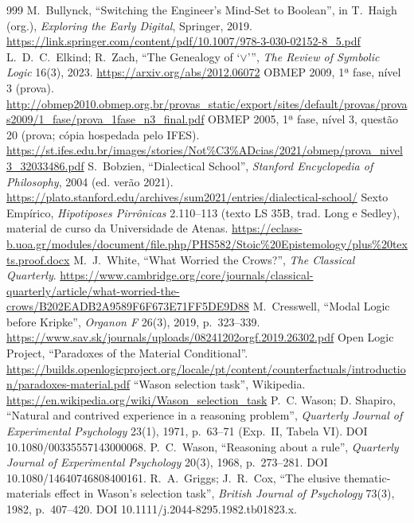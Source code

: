\begin{thebibliography}{999}
 M.~Bullynck, \enquote{Switching the Engineer's Mind-Set to Boolean}, in T.~Haigh (org.), \emph{Exploring the Early Digital}, Springer, 2019. \url{https://link.springer.com/content/pdf/10.1007/978-3-030-02152-8_5.pdf}
 L.~D.~C.~Elkind; R.~Zach, \enquote{The Genealogy of `$\vee$'}, \emph{The Review of Symbolic Logic} 16(3), 2023. \url{https://arxiv.org/abs/2012.06072}
 OBMEP 2009, 1ª fase, nível 3 (prova). \url{http://obmep2010.obmep.org.br/provas_static/export/sites/default/provas/provas2009/1_fase/prova_1fase_n3_final.pdf}
 OBMEP 2005, 1ª fase, nível 3, questão 20 (prova; cópia hospedada pelo IFES). \url{https://st.ifes.edu.br/images/stories/Not\%C3\%ADcias/2021/obmep/prova_nivel3_32033486.pdf}
 S.~Bobzien, \enquote{Dialectical School}, \emph{Stanford Encyclopedia of Philosophy}, 2004 (ed. verão 2021). \url{https://plato.stanford.edu/archives/sum2021/entries/dialectical-school/}
 Sexto Empírico, \emph{Hipotiposes Pirrônicas} 2.110--113 (texto LS 35B, trad. Long e Sedley), material de curso da Universidade de Atenas. \url{https://eclass-b.uoa.gr/modules/document/file.php/PHS582/Stoic\%20Epistemology/plus\%20texts.proof.docx}
 M.~J.~White, \enquote{What Worried the Crows?}, \emph{The Classical Quarterly}. \url{https://www.cambridge.org/core/journals/classical-quarterly/article/what-worried-the-crows/B202EADB2A9589F6F673E71FF5DE9D88}
 M.~Cresswell, \enquote{Modal Logic before Kripke}, \emph{Organon F} 26(3), 2019, p.~323--339. \url{https://www.sav.sk/journals/uploads/08241202orgf.2019.26302.pdf}
 Open Logic Project, \enquote{Paradoxes of the Material Conditional}. \url{https://builds.openlogicproject.org/locale/pt/content/counterfactuals/introduction/paradoxes-material.pdf}
 \enquote{Wason selection task}, Wikipedia. \url{https://en.wikipedia.org/wiki/Wason_selection_task}
 P.~C. Wason; D. Shapiro, \enquote{Natural and contrived experience in a reasoning problem}, \emph{Quarterly Journal of Experimental Psychology} 23(1), 1971, p.~63--71 (Exp.~II, Tabela VI). DOI 10.1080/00335557143000068.
 P.~C.~Wason, \enquote{Reasoning about a rule}, \emph{Quarterly Journal of Experimental Psychology} 20(3), 1968, p.~273--281. DOI 10.1080/14640746808400161.
 R.~A.~Griggs; J.~R.~Cox, \enquote{The elusive thematic-materials effect in Wason's selection task}, \emph{British Journal of Psychology} 73(3), 1982, p.~407--420. DOI 10.1111/j.2044-8295.1982.tb01823.x.

\end{thebibliography}
